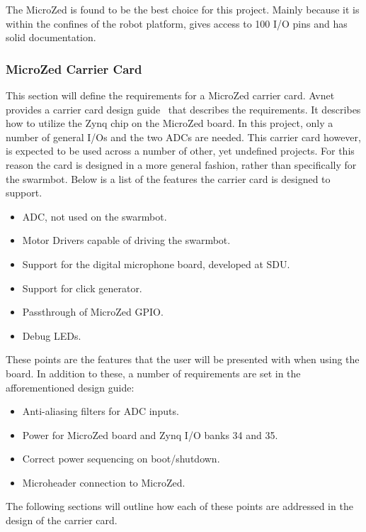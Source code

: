 The MicroZed is found to be the best choice for this project.
Mainly because it is within the confines of the robot platform, gives access to 100 I/O pins and has solid documentation.

\subsubsection*{MicroZed Carrier Card}
This section will define the requirements for a MicroZed carrier card.
Avnet provides a carrier card design guide~\cite{design_carrier} that describes the requirements.
It describes how to utilize the Zynq chip on the MicroZed board.
In this project, only a number of general I/Os and the two ADCs are needed.
This carrier card however, is expected to be used across a number of other, yet undefined projects.
For this reason the card is designed in a more general fashion, rather than specifically for the swarmbot.
Below is a list of the features the carrier card is designed to support.

\begin{itemize}
	\item ADC, not used on the swarmbot.
	\item Motor Drivers capable of driving the swarmbot.
	\item Support for the digital microphone board, developed at SDU.
	\item Support for click generator.
	\item Passthrough of MicroZed GPIO.
	\item Debug LEDs.
\end{itemize}

These points are the features that the user will be presented with when using the board.
In addition to these, a number of requirements are set in the afforementioned design guide:

\begin{itemize}
	\item Anti-aliasing filters for ADC inputs.
	\item Power for MicroZed board and Zynq I/O banks 34 and 35.
	\item Correct power sequencing on boot/shutdown.
	\item Microheader connection to MicroZed.
\end{itemize}

The following sections will outline how each of these points are addressed in the design of the carrier card.
